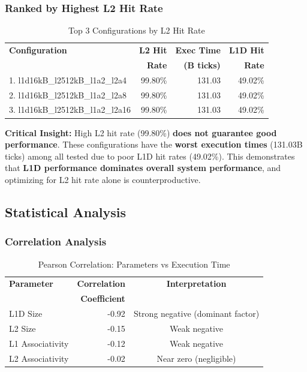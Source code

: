 \documentclass[11pt,a4paper]{article}
\begin{document}
\subsubsection{Ranked by Highest L2 Hit Rate}

\begin{table}[H]
\centering
\caption{Top 3 Configurations by L2 Hit Rate}
\begin{tabular}{lrrr}
\toprule
\textbf{Configuration} & \textbf{L2 Hit} & \textbf{Exec Time} & \textbf{L1D Hit} \\
 & \textbf{Rate} & \textbf{(B ticks)} & \textbf{Rate} \\
\midrule
1. l1d16kB\_l2512kB\_l1a2\_l2a4  & 99.80\% & 131.03 & 49.02\% \\
2. l1d16kB\_l2512kB\_l1a2\_l2a8  & 99.80\% & 131.03 & 49.02\% \\
3. l1d16kB\_l2512kB\_l1a2\_l2a16 & 99.80\% & 131.03 & 49.02\% \\
\bottomrule
\end{tabular}
\end{table}

\textbf{Critical Insight:} High L2 hit rate (99.80\%) \textbf{does not guarantee good performance}. These configurations have the \textbf{worst execution times} (131.03B ticks) among all tested due to poor L1D hit rates (49.02\%). This demonstrates that \textbf{L1D performance dominates overall system performance}, and optimizing for L2 hit rate alone is counterproductive.

\subsection{Statistical Analysis}

\subsubsection{Correlation Analysis}

\begin{table}[H]
\centering
\caption{Pearson Correlation: Parameters vs Execution Time}
\begin{tabular}{lrc}
\toprule
\textbf{Parameter} & \textbf{Correlation} & \textbf{Interpretation} \\
 & \textbf{Coefficient} & \\
\midrule
L1D Size & -0.92 & Strong negative (dominant factor) \\
L2 Size & -0.15 & Weak negative \\
L1 Associativity & -0.12 & Weak negative \\
L2 Associativity & -0.02 & Near zero (negligible) \\
\bottomrule
\end{tabular}
\end{table}
\end{document}
